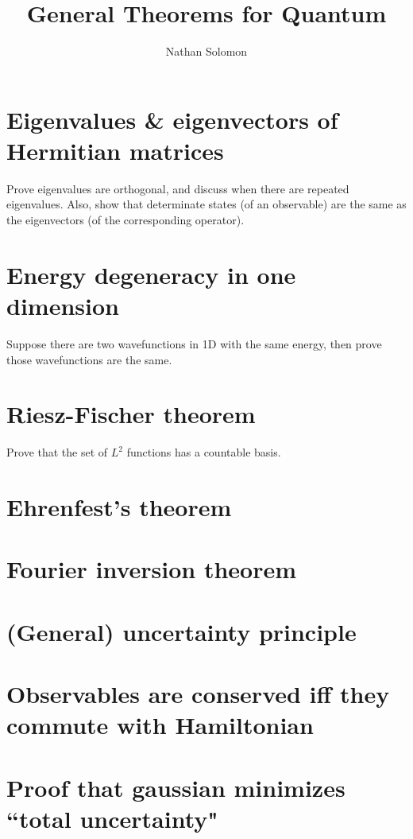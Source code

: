 \documentclass[12pt]{article}
\begin{document}
\title{General Theorems for Quantum}
\author{Nathan Solomon}
\maketitle

\tableofcontents

\section{Eigenvalues \& eigenvectors of Hermitian matrices}
Prove eigenvalues are orthogonal, and discuss when there are repeated eigenvalues. Also, show that determinate states (of an observable) are the same as the eigenvectors (of the corresponding operator).

\section{Energy degeneracy in one dimension}
Suppose there are two wavefunctions in 1D with the same energy, then prove those wavefunctions are the same.

\section{Riesz-Fischer theorem}
Prove that the set of $L^2$ functions has a countable basis.

\section{Ehrenfest's theorem}

\section{Fourier inversion theorem}

\section{(General) uncertainty principle}

\section{Observables are conserved iff they commute with Hamiltonian}

\section{Proof that gaussian minimizes ``total uncertainty"}
\end{document}
